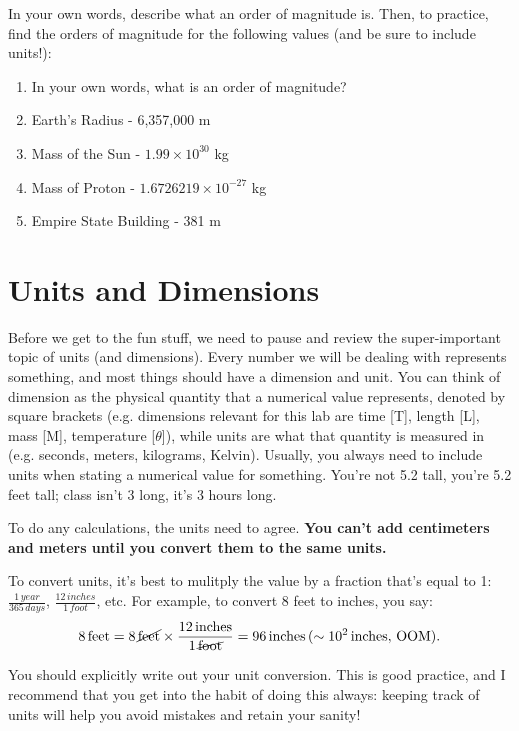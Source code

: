 \documentclass[12pt]{article}
\begin{document}
In your own words, describe what an order of magnitude is. Then, to practice, find the orders of magnitude for the following values (and be sure to include units!): 

\begin{enumerate}
\item{In your own words, what is an order of magnitude?}
\item{Earth's Radius - 6,357,000 m}
\item{Mass of the Sun - $1.99 \times 10^{30}$ kg}
\item{Mass of Proton - $1.6726219 \times 10^{-27}$ kg}
\item{Empire State Building - 381 m}
\end{enumerate}

\section*{Units and Dimensions}

Before we get to the fun stuff, we need to pause and review the super-important topic of units (and dimensions). Every number we will be dealing with represents something, and most things should have a dimension and unit. You can think of dimension as the physical quantity that a numerical value represents, denoted by square brackets (e.g. dimensions relevant for this lab are time [T], length [L], mass [M], temperature [$\theta$]), while units are what that quantity is measured in (e.g. seconds, meters, kilograms, Kelvin). Usually, you always need to include units when stating a numerical value for something. You're not 5.2 tall, you're 5.2 feet tall; class isn't 3 long, it's 3 hours long. 

To do any calculations, the units need to agree. \textbf{You can't add centimeters and meters until you convert them to the same units.} 

To convert units, it's best to mulitply the value by a fraction that's equal to 1: $\frac{1 \,year}{365 \,days}$, $\frac{12 \,inches}{1 \,foot}$, etc. For example, to convert 8 feet to inches, you say:
$$ 8 \, \mathrm{feet} = 8 \, \cancel{\mathrm{feet}} \times  \frac{12 \,\mathrm{inches}}{1 \,\cancel{\mathrm{foot}}} = 96 \, \mathrm{inches} \, (\sim 10^2 \, \mathrm{inches, \, OOM}).$$

You should explicitly write out your unit conversion. This is good practice, and I recommend that you get into the habit of doing this always: keeping track of units will help you avoid mistakes and retain your sanity!
\end{document}
